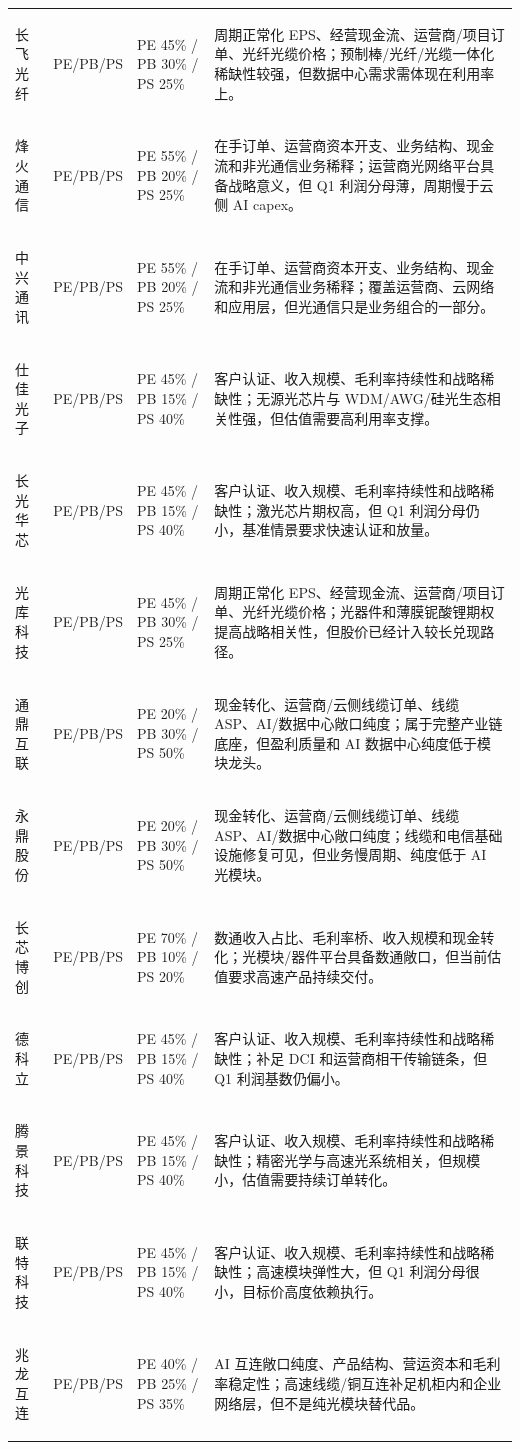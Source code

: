 \begin{exhibitbox}
\begin{tabularx}{\exhibitboxwidth}{>{\bfseries\raggedright\arraybackslash}p{1.5cm} >{\centering\arraybackslash}p{1.0cm} >{\raggedright\arraybackslash\sloppy\hspace{0pt}}p{2.2cm} >{\raggedright\arraybackslash\sloppy\hspace{0pt}}X}
长飞光纤 & PE/PB/PS & PE 45\% / PB 30\% / PS 25\% & 周期正常化 EPS、经营现金流、运营商/项目订单、光纤光缆价格；预制棒/光纤/光缆一体化稀缺性较强，但数据中心需求需体现在利用率上。 \\
烽火通信 & PE/PB/PS & PE 55\% / PB 20\% / PS 25\% & 在手订单、运营商资本开支、业务结构、现金流和非光通信业务稀释；运营商光网络平台具备战略意义，但 Q1 利润分母薄，周期慢于云侧 AI capex。 \\
中兴通讯 & PE/PB/PS & PE 55\% / PB 20\% / PS 25\% & 在手订单、运营商资本开支、业务结构、现金流和非光通信业务稀释；覆盖运营商、云网络和应用层，但光通信只是业务组合的一部分。 \\
仕佳光子 & PE/PB/PS & PE 45\% / PB 15\% / PS 40\% & 客户认证、收入规模、毛利率持续性和战略稀缺性；无源光芯片与 WDM/AWG/硅光生态相关性强，但估值需要高利用率支撑。 \\
长光华芯 & PE/PB/PS & PE 45\% / PB 15\% / PS 40\% & 客户认证、收入规模、毛利率持续性和战略稀缺性；激光芯片期权高，但 Q1 利润分母仍小，基准情景要求快速认证和放量。 \\
光库科技 & PE/PB/PS & PE 45\% / PB 30\% / PS 25\% & 周期正常化 EPS、经营现金流、运营商/项目订单、光纤光缆价格；光器件和薄膜铌酸锂期权提高战略相关性，但股价已经计入较长兑现路径。 \\
通鼎互联 & PE/PB/PS & PE 20\% / PB 30\% / PS 50\% & 现金转化、运营商/云侧线缆订单、线缆 ASP、AI/数据中心敞口纯度；属于完整产业链底座，但盈利质量和 AI 数据中心纯度低于模块龙头。 \\
永鼎股份 & PE/PB/PS & PE 20\% / PB 30\% / PS 50\% & 现金转化、运营商/云侧线缆订单、线缆 ASP、AI/数据中心敞口纯度；线缆和电信基础设施修复可见，但业务慢周期、纯度低于 AI 光模块。 \\
长芯博创 & PE/PB/PS & PE 70\% / PB 10\% / PS 20\% & 数通收入占比、毛利率桥、收入规模和现金转化；光模块/器件平台具备数通敞口，但当前估值要求高速产品持续交付。 \\
德科立 & PE/PB/PS & PE 45\% / PB 15\% / PS 40\% & 客户认证、收入规模、毛利率持续性和战略稀缺性；补足 DCI 和运营商相干传输链条，但 Q1 利润基数仍偏小。 \\
腾景科技 & PE/PB/PS & PE 45\% / PB 15\% / PS 40\% & 客户认证、收入规模、毛利率持续性和战略稀缺性；精密光学与高速光系统相关，但规模小，估值需要持续订单转化。 \\
联特科技 & PE/PB/PS & PE 45\% / PB 15\% / PS 40\% & 客户认证、收入规模、毛利率持续性和战略稀缺性；高速模块弹性大，但 Q1 利润分母很小，目标价高度依赖执行。 \\
兆龙互连 & PE/PB/PS & PE 40\% / PB 25\% / PS 35\% & AI 互连敞口纯度、产品结构、营运资本和毛利率稳定性；高速线缆/铜互连补足机柜内和企业网络层，但不是纯光模块替代品。 \\

\end{tabularx}
\end{exhibitbox}
